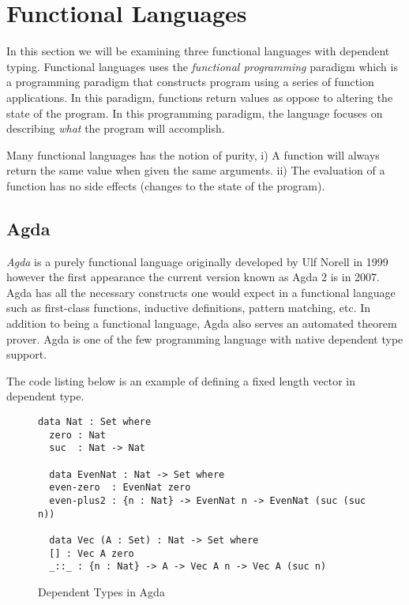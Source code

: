 \documentclass[a4paper,12pt]{report}
\begin{document}
\section{Functional Languages}

In this section we will be examining three functional languages with 
dependent typing. Functional languages 
uses the \textit{functional programming} \cite{overviewFP} paradigm which is a programming 
paradigm that constructs program using a series of function applications. In 
this paradigm, functions return values as oppose to altering the state of the 
program. In this programming paradigm, the language focuses on describing 
\textit{what} the program will accomplish.

\par

Many functional languages has the notion of purity, i) A function will always 
return the same value when given the same arguments. ii) The evaluation of a 
function has no side effects (changes to the state of the program).

\subsection{Agda}

\textit{Agda} \cite{agda} is a purely functional language originally developed by Ulf Norell in 
1999 however the first appearance the current version known as Agda 2 is in 
2007. Agda has all the necessary constructs one would expect in a functional 
language such as first-class functions, inductive definitions, pattern matching, 
etc. In addition to being a functional language, Agda also serves an automated theorem prover. 
Agda is one of the few programming language with native dependent type support. 

\par
The code listing below is an example of defining a fixed length vector in 
dependent type. 

\begin{figure}[H]
  \begin{lstlisting}[mathescape=true] 
  data Nat : Set where 
  zero : Nat
  suc  : Nat -> Nat  
  
  data EvenNat : Nat -> Set where
  even-zero  : EvenNat zero
  even-plus2 : {n : Nat} -> EvenNat n -> EvenNat (suc (suc n))
  
  data Vec (A : Set) : Nat -> Set where
  [] : Vec A zero
  _::_ : {n : Nat} -> A -> Vec A n -> Vec A (suc n)
  \end{lstlisting}
  \caption{Dependent Types in Agda}
\end{figure}
\end{document}
